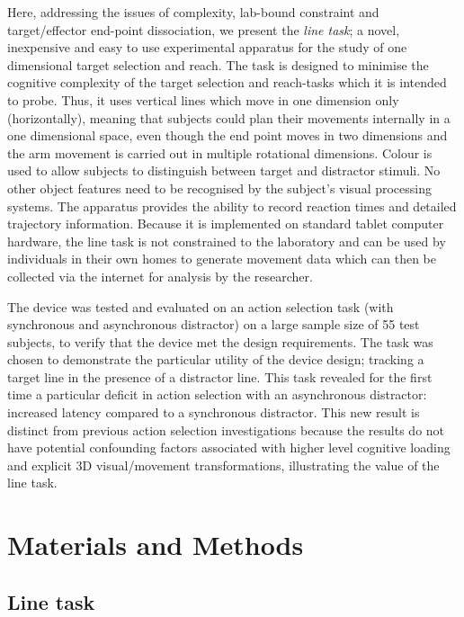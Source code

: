 \documentclass[10pt,letterpaper]{article}
\begin{document}
Here, addressing the issues of complexity, lab-bound constraint and
target/effector end-point dissociation, we present the \emph{line
  task}; a novel, inexpensive and easy to use experimental apparatus
for the study of one dimensional target selection and reach. The task
is designed to minimise the cognitive complexity of the target
selection and reach-tasks which it is intended to probe. Thus, it uses
vertical lines which move in one dimension only (horizontally),
meaning that subjects could plan their movements internally in a one
dimensional space, even though the end point moves in two dimensions
and the arm movement is carried out in multiple rotational dimensions.
Colour is used to allow subjects to distinguish between target and
distractor stimuli. No other object features need to be recognised by
the subject's visual processing systems. The apparatus provides the
ability to record reaction times and detailed trajectory
information. Because it is implemented on standard tablet computer
hardware, the line task is not constrained to the laboratory and can
be used by individuals in their own homes to generate movement data
which can then be collected via the internet for analysis by the
researcher.

The device was tested and evaluated on an action selection task (with
synchronous and asynchronous distractor) on a large sample size of 55
test subjects, to verify that the device met the design
requirements. The task was chosen to demonstrate the particular
utility of the device design; tracking a target line in the presence
of a distractor line. This task revealed for the first time a
particular deficit in action selection with an asynchronous
distractor: increased latency compared to a synchronous
distractor. This new result is distinct from previous action selection
investigations because the results do not have potential confounding
factors associated with higher level cognitive loading and explicit 3D
visual/movement transformations, illustrating the value of the line
task.

\section*{Materials and Methods}
\subsection*{Line task}
\end{document}
